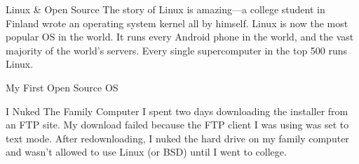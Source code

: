 \documentclass[14pt]{beamer}
\begin{document}
\begin{frame}{Linux \& Open Source}
  The story of Linux is amazing---a college student in Finland wrote an
  operating system kernel all by himself.
  \newline
  \newline
  Linux is now the most popular OS in the world. It runs every Android phone in
  the world, and the vast majority of the world's servers. Every single
  supercomputer in the top 500 runs Linux.
\end{frame}

\begin{frame}{My First Open Source OS}
\end{frame}

\begin{frame}{I Nuked The Family Computer}
  I spent two days downloading the installer from an FTP site. My download
  failed because the FTP client I was using was set to text mode.
  \newline
  \newline
  After redownloading, I nuked the hard drive on my family computer and wasn't
  allowed to use Linux (or BSD) until I went to college.
\end{frame}
\end{document}
